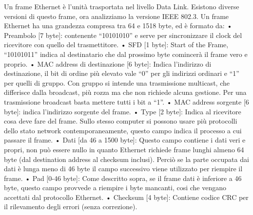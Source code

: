 Un frame Ethernet è l’unità trasportata nel livello Data Link.
Esistono diverse versioni di questo frame, ora analizziamo la versione IEEE 802.3. 
Un frame Ethernet ha una grandezza compresa tra 64 e 1518 byte, ed è formato da:
•	Preambolo [7 byte]: contenente “10101010” e serve per sincronizzare il clock del ricevitore con quello del trasmettitore.
•	SFD [1 byte]: Start of the Frame, “10101011” indica al destinatario che dal prossimo byte comincerà il frame vero e proprio.
•	MAC address di destinazione [6 byte]: Indica l’indirizzo di destinazione, il bit di ordine più elevato vale “0” per gli indirizzi ordinari e “1” per quelli di gruppo. Con gruppo si intende una trasmissione multicast, che differisce dalla broadcast, più rozza ma che non richiede alcuna gestione. Per una trasmissione broadcast basta mettere tutti i bit a “1”.
•	MAC address sorgente [6 byte]: indica l’indirizzo sorgente del frame.
•	Type [2 byte]: Indica al ricevitore cosa deve fare del frame. Sullo stesso computer si possono usare più protocolli dello stato network contemporaneamente, questo campo indica il processo a cui passare il frame.
•	Dati [da 46 a 1500 byte]: Questo campo contiene i dati veri e propri, non può essere nullo in quanto Ethernet richiede frame lunghi almeno 64 byte (dal destination address al checksum inclusi). Perciò se la parte occupata dai dati è lunga meno di 46 byte il campo successivo viene utilizzato per riempire il frame.
•	Pad [0-46 byte]: Come descritto sopra, se il frame dati è inferiore a 46 byte, questo campo provvede a riempire i byte mancanti, cosi che vengano accettati dal protocollo Ethernet.
•	Checksum [4 byte]: Contiene codice CRC per il rilevamento degli errori (senza correzione).

 
